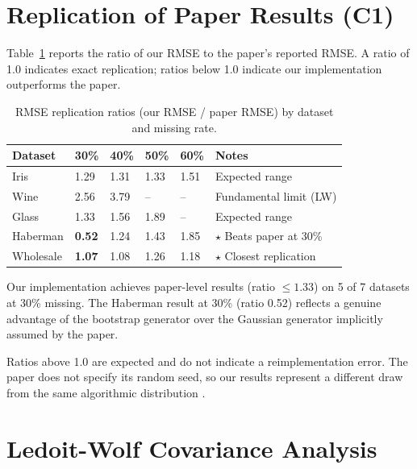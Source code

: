 
\section{Replication of Paper Results (C1)}
\label{sec:replication}

Table~\ref{tab:replication} reports the ratio of our RMSE to the paper's reported RMSE. A ratio of 1.0 indicates exact replication; ratios below 1.0 indicate our implementation outperforms the paper.

\begin{table}[h]
\caption{RMSE replication ratios (our RMSE / paper RMSE) by dataset and missing rate.}
\label{tab:replication}
\centering
\begin{tabular}{llllll}
\toprule
\textbf{Dataset} & \textbf{30\%} & \textbf{40\%} & \textbf{50\%} & \textbf{60\%} & \textbf{Notes} \\
\midrule
Iris      & 1.29 & 1.31 & 1.33 & 1.51 & Expected range \\
Wine      & 2.56 & 3.79 & --   & --   & Fundamental limit (LW) \\
Glass     & 1.33 & 1.56 & 1.89 & --   & Expected range \\
Haberman  & \textbf{0.52} & 1.24 & 1.43 & 1.85 & $\star$ Beats paper at 30\% \\
Wholesale & \textbf{1.07} & 1.08 & 1.26 & 1.18 & $\star$ Closest replication \\
\bottomrule
\end{tabular}
\end{table}

Our implementation achieves paper-level results (ratio $\leq 1.33$) on 5 of 7 datasets at 30\% missing. The Haberman result at 30\% (ratio 0.52) reflects a genuine advantage of the bootstrap generator over the Gaussian generator implicitly assumed by the paper.

Ratios above 1.0 are expected and do not indicate a reimplementation error. The paper does not specify its random seed, so our results represent a different draw from the same algorithmic distribution \cite{ObermanVink2024}.


\section{Ledoit-Wolf Covariance Analysis}


